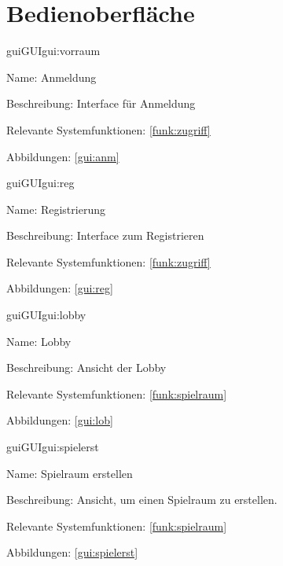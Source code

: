 
\section{Bedienoberfläche}

\setcounter{gui}{10}

\begin{description}[leftmargin=5em, style=sameline]	
	\begin{lhp}{gui}{GUI}{gui:vorraum}
		\item[Name:] Anmeldung
		\item[Beschreibung:] Interface für Anmeldung
		\item[Relevante Systemfunktionen:] \ref{funk:zugriff}
		\item[Abbildungen:] \ref{gui:anm}
	\end{lhp}
\end{description}

\begin{description}[leftmargin=5em, style=sameline]	
	\begin{lhp}{gui}{GUI}{gui:reg}
		\item[Name:] Registrierung
		\item[Beschreibung:] Interface zum Registrieren
		\item[Relevante Systemfunktionen:] \ref{funk:zugriff}
		\item[Abbildungen:] \ref{gui:reg}
	\end{lhp}
\end{description}

\begin{description}[leftmargin=5em, style=sameline]	
	\begin{lhp}{gui}{GUI}{gui:lobby}
		\item[Name:] Lobby
		\item[Beschreibung:] Ansicht der Lobby
		\item[Relevante Systemfunktionen:] \ref{funk:spielraum}
		\item[Abbildungen:] \ref{gui:lob}
	\end{lhp}
\end{description}

\begin{description}[leftmargin=5em, style=sameline]	
	\begin{lhp}{gui}{GUI}{gui:spielerst}
		\item[Name:] Spielraum erstellen
		\item[Beschreibung:] Ansicht, um einen Spielraum zu erstellen.
		\item[Relevante Systemfunktionen:] \ref{funk:spielraum}
		\item[Abbildungen:] \ref{gui:spielerst}
	\end{lhp}
\end{description}

